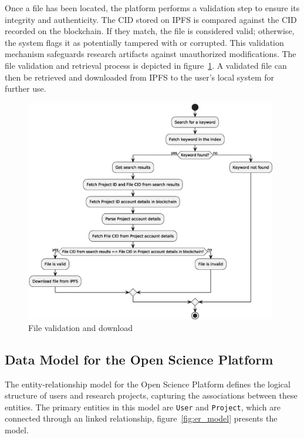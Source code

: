 \documentclass{article}
\begin{document}
Once a file has been located, the platform performs a validation step to ensure its integrity and authenticity. The CID stored on IPFS is compared against the CID recorded on the blockchain. If they match, the file is considered valid; otherwise, the system flags it as potentially tampered with or corrupted. This validation mechanism safeguards research artifacts against unauthorized modifications. The file validation and retrieval process is depicted in figure~\ref{fig:c4_file_validation}. A validated file can then be retrieved and downloaded from IPFS to the user's local system for further use.

\begin{figure}[htbp]
      \centering
      \includegraphics[width=0.98\textwidth, keepaspectratio]{keyword_and_file_validation.eps}
      \caption{File validation and download}
      \label{fig:c4_file_validation}
\end{figure}



\subsection{Data Model for the Open Science Platform}

The entity-relationship model for the Open Science Platform defines the logical structure of users and research projects, capturing the associations between these entities. The primary entities in this model are \texttt{User} and \texttt{Project}, which are connected through an linked relationship, figure~\ref{fig:er_model} presents the model.
\end{document}

